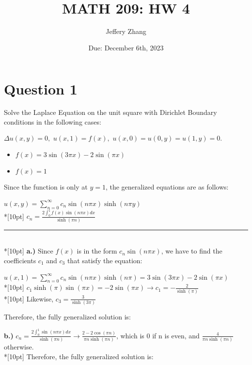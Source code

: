 \documentclass{article}
\title{\textbf{MATH 209: HW 4}}
\author{Jeffery Zhang}
\date{Due: December 6th, 2023}
\begin{document}
\maketitle

\section{Question 1}
Solve the Laplace Equation on the unit square with Dirichlet Boundary conditions in the following cases:
\begin{center}
    \(\Delta u(x, y) = 0, \,\, u(x, 1) = f(x), \,\, u(x, 0) = u(0, y) = u(1, y) = 0\).
\end{center}
\begin{itemize}
    \item \(f(x) = 3\sin (3\pi x) - 2\sin(\pi x)\)
    \item \(f(x) = 1\)
\end{itemize}
Since the function is only at \(y = 1\), the generalized equations are as follows:
\begin{center}
    \(\displaystyle u(x, y) = \sum_{n = 0}^{\infty}c_n\sin(n\pi x)\sinh(n\pi y)\)\\*[10pt]
    \(\displaystyle c_n = \frac{2\int_{0}^{1}f(x)\sin (n\pi x)dx}{\sinh(\pi n)}\)
\end{center}
\rule{\linewidth}{0.2mm}\\*[10pt]
\textbf{a.)} Since \(f(x)\) is in the form \(c_n\sin(n\pi x)\), we have to find the coefficients \(c_1\) and \(c_3\) that satisfy the equation:
\begin{center}
    \(\displaystyle u(x, 1) = \sum_{n = 0}^{\infty}c_n\sin(n\pi x)\sinh(n\pi) = 3\sin (3\pi x) - 2\sin(\pi x)\)\\*[10pt]
    \(\displaystyle c_1\sinh(\pi)\sin(\pi x) = -2\sin(\pi x)\rightarrow c_1 = -\frac{2}{\sinh(\pi)}\)\\*[10pt]
    Likewise, \(\displaystyle c_3 = \frac{3}{\sinh(3\pi)}\)
\end{center}
Therefore, the fully generalized solution is:
\begin{center}
\end{center}
\textbf{b.)} \(\displaystyle c_n = \frac{2\int_{0}^{1}\sin (n\pi x)dx}{\sinh(\pi n)}\rightarrow \frac{2 - 2\cos (\pi n)}{\pi n\sinh(\pi n)}\), which is 0 if n is even, and \(\displaystyle\frac{4}{\pi n\sinh(\pi n)}\) otherwise. \\*[10pt]
Therefore, the fully generalized solution is:
\begin{center}
\end{center}
\end{document}
